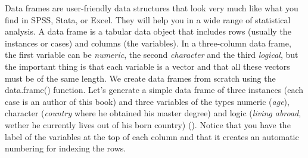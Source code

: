 Data frames are user-friendly data structures that look very much like
what you find in SPSS, Stata, or Excel. They will help you in a wide
range of statistical analysis.  A
data frame is a tabular data object that includes rows (usually the
instances or cases) and columns (the variables). In a three-column data frame,
the first variable can be \emph{numeric}, the second \emph{character}
and the third \emph{logical}, but the important thing is that each
variable is a vector and that all these vectors must be of the same
length. We create data frames from scratch using the data.frame()
function.  Let’s generate a simple data frame of three instances (each
case is an author of this book) and three variables of the types
numeric (\emph{age}), character (\emph{country} where he obtained his
master degree) and logic (\emph{living abroad}, wether he currently
lives out of his born country) ().
Notice that you have the label of the variables at the top of each column and that it creates an automatic numbering for indexing the rows.  

